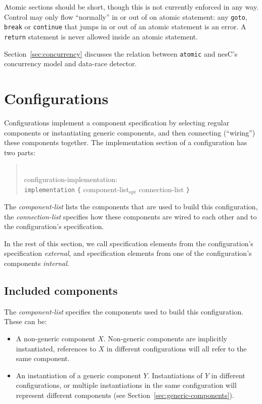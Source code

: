 \documentclass[11pt,letterpaper]{article}
\newcommand{\kw}[1]{{\tt #1}}
\newcommand{\nesc}{nesC\xspace}
\newcommand{\opt}{$_{\mbox{opt}}$\xspace}
\newcommand{\grammarshift}{\vspace*{-.7cm}}
\newcommand{\grammarindent}{\hspace*{2cm}\= \\ \kill}
\begin{document}
Atomic sections should be short, though this is not currently enforced in
any way.  Control may only flow ``normally'' in or out of on atomic
statement: any \kw{goto}, \kw{break} or \kw{continue} that jumps in or out
of an atomic statement is an error. A \kw{return} statement is never
allowed inside an atomic statement.

Section~\ref{sec:concurrency} discusses the relation between \kw{atomic} and
\nesc's concurrency model and data-race detector.

\section{Configurations}
\label{sec:configuration}

Configurations implement a component specification by selecting regular
components or instantiating generic components, and then connecting
(``wiring'') these components together. The implementation section of
a configuration has two parts:
\begin{quote} \grammarshift \em \begin{tabbing}
\grammarindent
configuration-implementation:\\
\>	\kw{implementation} \kw{\{} component-list\opt connection-list \kw{\}}\\
\end{tabbing} \end{quote}
The \emph{component-list} lists the components that are used to build this
configuration, the \emph{connection-list} specifies how these components
are wired to each other and to the configuration's specification.

In the rest of this section, we call specification elements from the
configuration's specification \emph{external},
and specification elements from one of the configuration's components
\emph{internal}.

\subsection{Included components}
\label{sec:config-components}

The \emph{component-list} specifies the components used to build this
configuration. These can be:
\begin{itemize}
\item A non-generic component $X$. Non-generic components are implicitly
instantiated, references to $X$ in different configurations will all
refer to the same component.

\item An instantiation of a generic component $Y$. Instantiations of $Y$ in
different configurations, or multiple instantiations in the same
configuration will represent different components (see
Section~\ref{sec:generic-components}).
\end{itemize}
\end{document}
